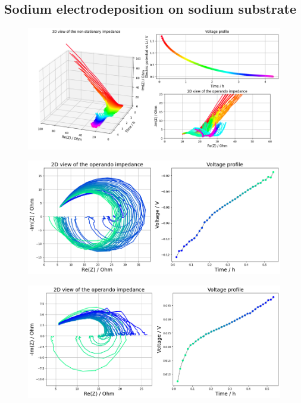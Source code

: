\subsection{Sodium electrodeposition on sodium substrate}

\begin{figure}[h]
    \centering
    \includegraphics[width=\linewidth]{figures/application3/image10.png}

\end{figure}

\begin{figure}[h]
    \centering
    \includegraphics[width=\linewidth]{figures/application3/image11.png}
\end{figure}

\begin{figure}[h]
    \centering
    \includegraphics[width=\linewidth]{figures/application3/image12.png}
\end{figure}

